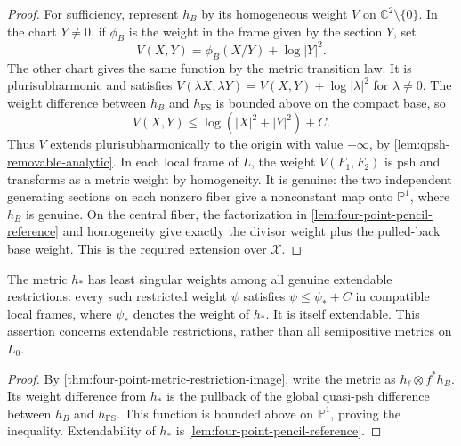 \begin{proof}
For sufficiency, represent $h_B$ by its homogeneous weight $V$ on $\mathbb C^2\setminus\{0\}$. In the chart $Y\ne0$, if $\phi_B$ is the weight in the frame given by the section $Y$, set
\[
 V(X,Y)=\phi_B(X/Y)+\log|Y|^2.
\]
The other chart gives the same function by the metric transition law. It is plurisubharmonic and satisfies $V(\lambda X,\lambda Y)=V(X,Y)+\log|\lambda|^2$ for $\lambda\ne0$. The weight difference between $h_B$ and $h_{\mathrm{FS}}$ is bounded above on the compact base, so
\[
 V(X,Y)\leq\log(|X|^2+|Y|^2)+C.
\]
Thus $V$ extends plurisubharmonically to the origin with value $-\infty$, by \cref{lem:qpsh-removable-analytic}. In each local frame of $L$, the weight $V(F_1,F_2)$ is psh and transforms as a metric weight by homogeneity. It is genuine: the two independent generating sections on each nonzero fiber give a nonconstant map onto $\mathbb P^1$, where $h_B$ is genuine. On the central fiber, the factorization in \cref{lem:four-point-pencil-reference} and homogeneity give exactly the divisor weight plus the pulled-back base weight. This is the required extension over $\mathcal X$.
\end{proof}

\begin{corollary}\label{cor:four-point-least-singular-extendable}
The metric $h_*$ has least singular weights among all genuine extendable restrictions: every such restricted weight $\psi$ satisfies $\psi\leq\psi_*+C$ in compatible local frames, where $\psi_*$ denotes the weight of $h_*$. It is itself extendable. This assertion concerns extendable restrictions, rather than all semipositive metrics on $L_0$.
\end{corollary}
\begin{proof}
By \cref{thm:four-point-metric-restriction-image}, write the metric as $h_\ell\otimes f^*h_B$. Its weight difference from $h_*$ is the pullback of the global quasi-psh difference between $h_B$ and $h_{\mathrm{FS}}$. This function is bounded above on $\mathbb P^1$, proving the inequality. Extendability of $h_*$ is \cref{lem:four-point-pencil-reference}.
\end{proof}

